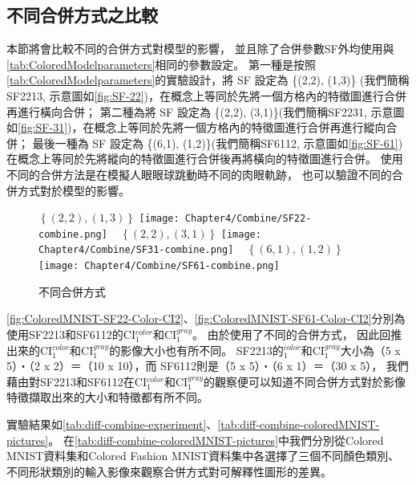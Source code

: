 \documentclass[class=NCU\_thesis, crop=false]{standalone}
\begin{document}
    \pagebreak

    \subsection{不同合併方式之比較}
    本節將會比較不同的合併方式對模型的影響，
    並且除了合併參數SF外均使用與\cref{tab:ColoredModelparameters}相同的參數設定。
    第一種是按照\cref{tab:ColoredModelparameters}的實驗設計，將 SF 設定為 \{(2,2), (1,3)\}
    (我們簡稱SF2213, 示意圖如\cref{fig:SF-22})，在概念上等同於先將一個方格內的特徵圖進行合併再進行橫向合併；
    第二種為將 SF 設定為 \{(2,2), (3,1)\}(我們簡稱SF2231, 示意圖如\cref{fig:SF-31})，在概念上等同於先將一個方格內的特徵圖進行合併再進行縱向合併；
    最後一種為 SF 設定為 \{(6,1), (1,2)\}(我們簡稱SF6112, 示意圖如\cref{fig:SF-61})
    在概念上等同於先將縱向的特徵圖進行合併後再將橫向的特徵圖進行合併。
    使用不同的合併方法是在模擬人眼眼球跳動時不同的肉眼軌跡，
    也可以驗證不同的合併方式對於模型的影響。

    \begin{figure}[H]
        \subcaptionbox
            {$\left\{(2, 2), (1, 3)\right\}$
            \label{fig:SF-22}}
            {\texttt{[image: Chapter4/Combine/SF22-combine.png]}}
        ~
        \subcaptionbox
            {$\left\{(2, 2), (3, 1)\right\}$
            \label{fig:SF-31}}
            {\texttt{[image: Chapter4/Combine/SF31-combine.png]}}
        ~
        \subcaptionbox
            {$\left\{(6, 1), (1, 2)\right\}$
            \label{fig:SF-61}}
            {\texttt{[image: Chapter4/Combine/SF61-combine.png]}}
        ~
        \caption{不同合併方式}
        \label{fig:SF}
    \end{figure}

	\cref{fig:ColoredMNIST-SF22-Color-CI2}、\cref{fig:ColoredMNIST-SF61-Color-CI2}分別為使用SF2213和SF6112的CI$^{color}_{1}$和CI$^{gray}_{1}$。
	由於使用了不同的合併方式，
	因此回推出來的CI$^{color}_{1}$和CI$^{gray}_{1}$的影像大小也有所不同。
	SF2213的$^{color}_{1}$和CI$^{gray}_{1}$大小為（5 x 5）‧（2 x 2）＝（10 x 10），而
    SF6112則是（5 x 5）‧（6 x 1）＝（30 x 5），
    我們藉由對SF2213和SF6112在CI$^{color}_{1}$和CI$^{gray}_{1}$的觀察便可以知道不同合併方式對於影像特徵擷取出來的大小和特徵都有所不同。

    實驗結果如\cref{tab:diff-combine-experiment}、\cref{tab:diff-combine-coloredMNIST-pictures}。 在\cref{tab:diff-combine-coloredMNIST-pictures}中我們分別從Colored MNIST資料集和Colored Fashion MNIST資料集中各選擇了三個不同顏色類別、不同形狀類別的輸入影像來觀察合併方式對可解釋性圖形的差異。
\end{document}
